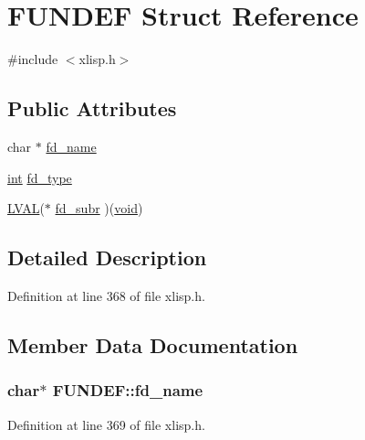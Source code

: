 \hypertarget{struct_f_u_n_d_e_f}{}\section{F\+U\+N\+D\+EF Struct Reference}
\label{struct_f_u_n_d_e_f}


{\ttfamily \#include $<$xlisp.\+h$>$}

\subsection*{Public Attributes}
\begin{DoxyCompactItemize}
\item 
char $\ast$ \hyperlink{struct_f_u_n_d_e_f_ab0f2f590497d08e87e4d2e6eac13c5d1}{fd\+\_\+name}
\item 
\hyperlink{xmltok_8h_a5a0d4a5641ce434f1d23533f2b2e6653}{int} \hyperlink{struct_f_u_n_d_e_f_a45e6bfa885882cf372d92ae76c07a0fd}{fd\+\_\+type}
\item 
\hyperlink{xldmem_8h_a9a9ec6a5fbca2b40ed8d19faa799be8c}{L\+V\+AL}($\ast$ \hyperlink{struct_f_u_n_d_e_f_a975ad9770b62d113a0b09849f9933420}{fd\+\_\+subr} )(\hyperlink{sound_8c_ae35f5844602719cf66324f4de2a658b3}{void})
\end{DoxyCompactItemize}


\subsection{Detailed Description}


Definition at line 368 of file xlisp.\+h.



\subsection{Member Data Documentation}
\subsubsection[{\texorpdfstring{fd\+\_\+name}{fd_name}}]{\setlength{\rightskip}{0pt plus 5cm}char$\ast$ F\+U\+N\+D\+E\+F\+::fd\+\_\+name}\hypertarget{struct_f_u_n_d_e_f_ab0f2f590497d08e87e4d2e6eac13c5d1}{}\label{struct_f_u_n_d_e_f_ab0f2f590497d08e87e4d2e6eac13c5d1}


Definition at line 369 of file xlisp.\+h.

